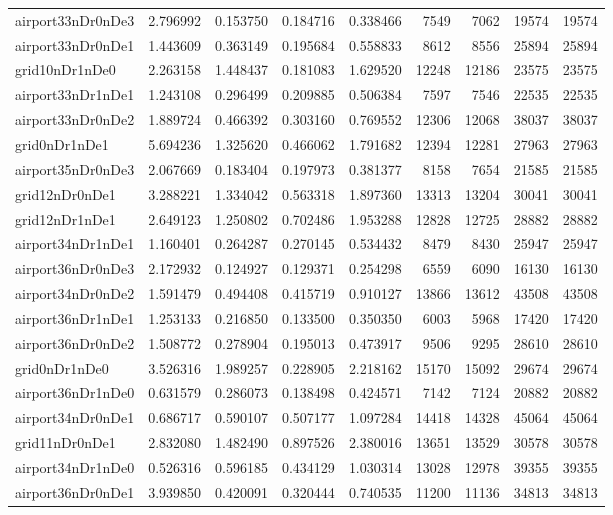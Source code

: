 \begin{longtable}{|l|r|r|r|r|r|r|r|r|}
airport33nDr0nDe3 & 2.796992 & 0.153750 & 0.184716 & 0.338466 & 7549 & 7062 & 19574 & 19574 \\
airport33nDr0nDe1 & 1.443609 & 0.363149 & 0.195684 & 0.558833 & 8612 & 8556 & 25894 & 25894 \\
grid10nDr1nDe0 & 2.263158 & 1.448437 & 0.181083 & 1.629520 & 12248 & 12186 & 23575 & 23575 \\
airport33nDr1nDe1 & 1.243108 & 0.296499 & 0.209885 & 0.506384 & 7597 & 7546 & 22535 & 22535 \\
airport33nDr0nDe2 & 1.889724 & 0.466392 & 0.303160 & 0.769552 & 12306 & 12068 & 38037 & 38037 \\
grid0nDr1nDe1 & 5.694236 & 1.325620 & 0.466062 & 1.791682 & 12394 & 12281 & 27963 & 27963 \\
airport35nDr0nDe3 & 2.067669 & 0.183404 & 0.197973 & 0.381377 & 8158 & 7654 & 21585 & 21585 \\
grid12nDr0nDe1 & 3.288221 & 1.334042 & 0.563318 & 1.897360 & 13313 & 13204 & 30041 & 30041 \\
grid12nDr1nDe1 & 2.649123 & 1.250802 & 0.702486 & 1.953288 & 12828 & 12725 & 28882 & 28882 \\
airport34nDr1nDe1 & 1.160401 & 0.264287 & 0.270145 & 0.534432 & 8479 & 8430 & 25947 & 25947 \\
airport36nDr0nDe3 & 2.172932 & 0.124927 & 0.129371 & 0.254298 & 6559 & 6090 & 16130 & 16130 \\
airport34nDr0nDe2 & 1.591479 & 0.494408 & 0.415719 & 0.910127 & 13866 & 13612 & 43508 & 43508 \\
airport36nDr1nDe1 & 1.253133 & 0.216850 & 0.133500 & 0.350350 & 6003 & 5968 & 17420 & 17420 \\
airport36nDr0nDe2 & 1.508772 & 0.278904 & 0.195013 & 0.473917 & 9506 & 9295 & 28610 & 28610 \\
grid0nDr1nDe0 & 3.526316 & 1.989257 & 0.228905 & 2.218162 & 15170 & 15092 & 29674 & 29674 \\
airport36nDr1nDe0 & 0.631579 & 0.286073 & 0.138498 & 0.424571 & 7142 & 7124 & 20882 & 20882 \\
airport34nDr0nDe1 & 0.686717 & 0.590107 & 0.507177 & 1.097284 & 14418 & 14328 & 45064 & 45064 \\
grid11nDr0nDe1 & 2.832080 & 1.482490 & 0.897526 & 2.380016 & 13651 & 13529 & 30578 & 30578 \\
airport34nDr1nDe0 & 0.526316 & 0.596185 & 0.434129 & 1.030314 & 13028 & 12978 & 39355 & 39355 \\
airport36nDr0nDe1 & 3.939850 & 0.420091 & 0.320444 & 0.740535 & 11200 & 11136 & 34813 & 34813 \\

\end{longtable}
